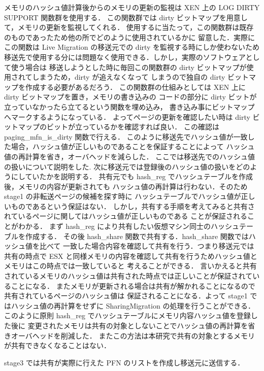 \documentclass[graduation-thesis]{mlarticle}
\begin{document}
メモリのハッシュ値計算後からのメモリの更新の監視は XEN 上の LOG DIRTY SUPPORT 関数群を使用する．
この関数群では dirty ビットマップを用意して，メモリの更新を監視してくれる．
使用するに当たって，この関数群は既存のものであったため他の所でどのように使用されているかに
留意した．実際にこの関数は Live Migration の移送元での dirty を監視する時にしか使わないため
移送先で使用する分には問題なく使用できる．しかし，実際のソフトウェアとして使う場合は
移送しようとした時に毎回この関数群の dirty ビットマップが使用されてしまうため，dirty が追えなくなって
しまうので独自の dirty ビットマップを作成する必要があるだろう．
この関数群の仕組みとしては XEN 上に dirty ビットマップを置き，メモリの書き込みの
コードの部分に dirty ビットが立っていなかったら立てるという関数を埋め込み，
書き込み事にビットマップへマークするようになっている．
よってページの更新を確認したい時は dirty ビットマップのビットが立っているかを確認すれば良い．
この確認は paging\_mfn\_is\_dirty 関数で行える．
このように移送先でハッシュ値が一致した場合，ハッシュ値が正しいものであることを保証することによって
ハッシュ値の再計算を省き，オーバヘッドを減らした．
ここでは移送先でのハッシュ値の扱いについて説明をした.
次に移送元では登録後のハッシュ値の扱いをどのようにしていたかを説明する．
共有元でも hash\_reg でハッシュテーブルを作成後，メモリの内容が更新されても
ハッシュ値の再計算は行わない．そのため stage1 の非転送ページの候補を探す時に
ハッシュテーブルでハッシュ値が正しいものであるという保証はない．
しかし，共有する手順を考えてみると共有されているページに関してはハッシュ値が正しいものである
ことが保証されることがわかる．
まず hash\_reg により共有したい仮想マシン同士のハッシュテーブルを作成する．
その後 hash\_share 関数で共有する．hash\_share 関数ではハッシュ値を比べて
一致した場合内容を確認して共有を行う．つまり移送元では共有の時点で
ESX と同様メモリの内容を確認して共有を行うためハッシュ値とメモリはこの時点では一致していると
考えることができる．
言いかえると共有されているメモリのハッシュ値は共有された時点では正しいことが保証されていることになる．
またメモリが更新される場合は共有が解かれることになるので共有されているページのハッシュ値は
保証されることになる．よって stage1 ではハッシュ値の再計算をせずに 
SharingMigration の処理を行うことができる．
このように原則 hash\_reg でハッシュテーブルにメモリ内容ハッシュ値を登録した後に
変更されたメモリは共有の対象としないことでハッシュ値の再計算を省きオーバヘッドを削減した．
またこの方法は本研究で共有の対象とするメモリが共有できなくなることはない．

stage3 では共有が実際に行えた PFN のリストを作成し移送元に送信する．
\end{document}
